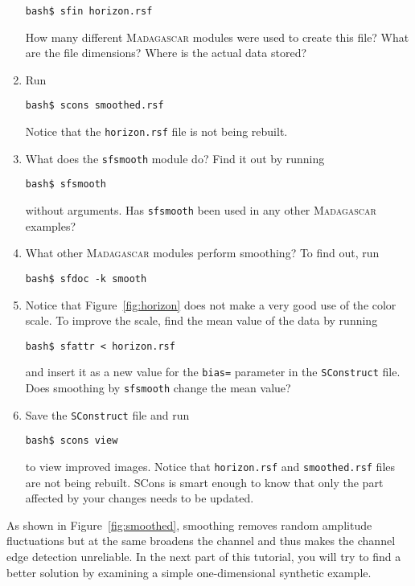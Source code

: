 \begin{enumerate}
\begin{verbatim}
bash$ sfin horizon.rsf
\end{verbatim}
How many different \textsc{Madagascar} modules were used to create this file? What are the file dimensions? Where is the actual data stored?
\item Run
\begin{verbatim}
bash$ scons smoothed.rsf
\end{verbatim}
Notice that the \texttt{horizon.rsf} file is not being rebuilt.
\item What does the \texttt{sfsmooth} module do? Find it out by running
\begin{verbatim}
bash$ sfsmooth
\end{verbatim}
without arguments. Has \texttt{sfsmooth} been used in any other \textsc{Madagascar} examples?
\item What other \textsc{Madagascar} modules perform smoothing? To find out, run
\begin{verbatim}
bash$ sfdoc -k smooth
\end{verbatim}
\item Notice that Figure~\ref{fig:horizon} does not make a very good use of the color scale. 
To improve the scale, find the mean value of the data by running
\begin{verbatim}
bash$ sfattr < horizon.rsf
\end{verbatim}
and insert it as a new value for the \texttt{bias=} parameter in the
\texttt{SConstruct} file. Does smoothing by \texttt{sfsmooth} change
the mean value?
\item Save the \texttt{SConstruct} file and run 
\begin{verbatim}
bash$ scons view
\end{verbatim}
to view improved images. Notice that \texttt{horizon.rsf} and \texttt{smoothed.rsf} files are not being rebuilt. SCons is smart enough to know that only the 
part affected by your changes needs to be updated.
\end{enumerate}

As shown in Figure~\ref{fig:smoothed}, smoothing removes random
amplitude fluctuations but at the same broadens the channel and thus
makes the channel edge detection unreliable. In the next part of this
tutorial, you will try to find a better solution by examining a simple
one-dimensional synthetic example.


